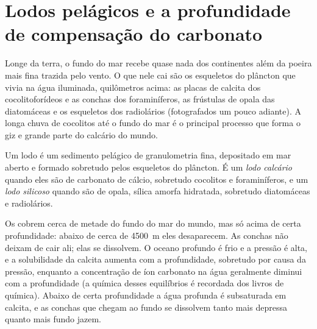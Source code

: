 \section{Lodos pelágicos e a profundidade de compensação do carbonato}\label{sec:b1:chemical-biogenic-sediments:oozes}

Longe da terra, o fundo do mar recebe quase nada dos continentes além da poeira mais fina
trazida pelo vento. O que nele cai são os esqueletos do plâncton que vivia na água
iluminada, quilômetros acima: as placas de calcita dos cocolitoforídeos e as conchas dos
foraminíferos, as frústulas de opala das diatomáceas e os esqueletos dos radiolários
(fotografados um pouco adiante). A longa chuva de cocolitos até o fundo do mar é o
principal processo que forma o giz e grande parte do calcário do mundo.

\begin{definition}\label{def:b1:chemical-biogenic-sediments:ooze}
Um lodo é um sedimento pelágico de granulometria fina, depositado em mar aberto e formado
sobretudo pelos esqueletos do plâncton. É um \emph{lodo calcário}
quando eles são de carbonato de cálcio, sobretudo cocolitos e foraminíferos, e um
\emph{lodo silicoso} quando são de opala, sílica amorfa hidratada,
sobretudo diatomáceas e radiolários.
\end{definition}

Os  cobrem cerca de metade do fundo do mar do mundo, mas só acima de certa
profundidade: abaixo de cerca de \qty{4500}{m} eles desaparecem. As conchas não deixam de
cair ali; elas se dissolvem. O oceano profundo é frio e a pressão é alta, e a solubilidade
da calcita aumenta com a profundidade, sobretudo por causa da pressão, enquanto a
concentração de íon carbonato na água geralmente diminui com a profundidade (a química
desses equilíbrios é recordada dos livros de química). Abaixo de certa profundidade a água
profunda é subsaturada em calcita, e as conchas que chegam ao fundo se dissolvem tanto
mais depressa quanto mais fundo jazem.

